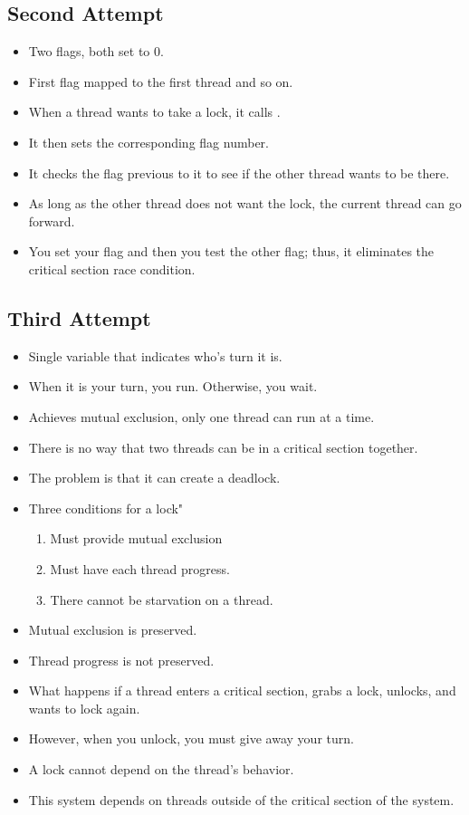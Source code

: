 \documentclass[]{article}
\begin{document}
\subsection{Second Attempt}
\begin{itemize}
\item Two flags, both set to 0.
\item First flag mapped to the first thread and so on.
\item When a thread wants to take a lock, it calls .
\item It then sets the corresponding flag number.
\item It checks the flag previous to it to see if the other thread wants to be
there.
\item As long as the other thread does not want the lock, the current thread can
go forward.
\item You set your flag and then you test the other flag; thus, it eliminates
the critical section race condition.
\end{itemize}

\subsection{Third Attempt}
\begin{itemize}
\item Single variable that indicates who's turn it is.
\item When it is your turn, you run. Otherwise, you wait.
\item Achieves mutual exclusion, only one thread can run at a time.
\item There is no way that two threads can be in a critical section together.
\item The problem is that it can create a deadlock.
\item Three conditions for a lock"
\begin{enumerate}
\item Must provide mutual exclusion
\item Must have each thread progress.
\item There cannot be starvation on a thread.
\end{enumerate}
\item Mutual exclusion is preserved.
\item Thread progress is not preserved.
\item What happens if a thread enters a critical section, grabs a lock, unlocks,
and wants to lock again.
\item However, when you unlock, you must give away your turn.
\item A lock cannot depend on the thread's behavior.
\item This system depends on threads outside of the critical section of the
system.
\end{itemize}
\end{document}
